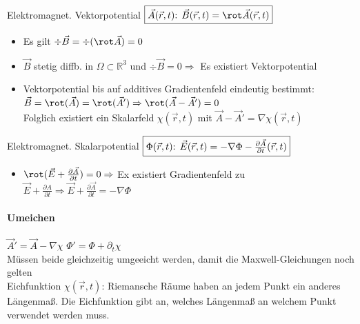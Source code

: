 Elektromagnet. Vektorpotential $\boxed{ \vec A(\vec r, t)$: $\vec B(\vec r,t) = \rot \vec A(\vec r,t) }$\\
\begin{itemize}
    \item Es gilt $\div \vec B = \div(\rot \vec A) = 0$
    \item $\vec B$ stetig diffb. in $\Omega \subset \mathbb R^3$ und $\div \vec B = 0 \Rightarrow$ Es existiert Vektorpotential
    \item Vektorpotential bis auf additives Gradientenfeld eindeutig bestimmt: $\vec B = \rot(\vec A) = \rot (\vec A') \Rightarrow \rot(\vec A - \vec A') = 0$ \\
          Folglich existiert ein Skalarfeld $\chi(\vec r, t)$ mit $\vec A - \vec A' = \nabla \chi(\vec r, t)$
\end{itemize}
Elektromagnet. Skalarpotential $\boxed{ \Phi(\vec r, t)$: $\vec E(\vec r,t) = - \nabla \Phi - \frac{\partial \vec A}{\partial t}(\vec r,t) }$\\
\begin{itemize}
    \item $\rot(\vec E + \frac{\partial\vec A}{\partial t}) = 0 \Rightarrow $ Ex existiert Gradientenfeld zu $\vec E + \frac{\partial A}{\partial t} \Rightarrow \vec E + \frac{\partial\vec A}{\partial t} = -\nabla \Phi$
\end{itemize}

\paragraph{Umeichen} $\vec A' = \vec A - \nabla \chi$ \qquad $\Phi' = \Phi + \partial_t \chi$ \\
Müssen beide gleichzeitig umgeeicht werden, damit die Maxwell-Gleichungen noch gelten \\

Eichfunktion $\chi(\vec r, t)$: Riemansche Räume haben an jedem Punkt ein anderes Längenmaß. Die Eichfunktion gibt an, welches Längenmaß an welchem Punkt verwendet werden muss.\\

